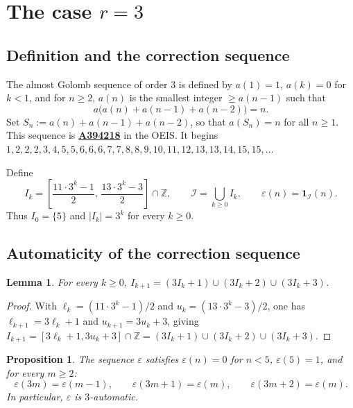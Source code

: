 \documentclass[12pt]{article}
\newtheorem{lemma}[theorem]{Lemma}
\newtheorem{proposition}[theorem]{Proposition}
\theoremstyle{definition}
\theoremstyle{remark}
\newcommand{\oeis}[1]{\href{https://oeis.org/#1}{\textbf{#1}}}
\begin{document}
\section{The case $r=3$}\label{sec:r3}

\subsection{Definition and the correction sequence}

The almost Golomb sequence of order $3$ is defined by $a(1)=1$, $a(k)=0$ for $k<1$,
and for $n\ge 2$, $a(n)$ is the smallest integer $\ge a(n-1)$ such that
\begin{equation}\label{eq:r3def}
  a\bigl(a(n)+a(n-1)+a(n-2)\bigr)=n.
\end{equation}
Set $S_n:=a(n)+a(n-1)+a(n-2)$, so that $a(S_n)=n$ for all $n\ge 1$.
This sequence is \oeis{A394218} in the OEIS. It begins
$1,2,2,2,3,4,5,5,6,6,6,7,7,8,8,9,10,11,12,13,13,14,15,15,\ldots$

Define
\begin{equation}\label{eq:Ik}
  I_k=\left[\frac{11\cdot 3^k-1}{2},\,\frac{13\cdot 3^k-3}{2}\right]\cap\mathbb{Z},
  \qquad
  \mathcal{I}=\bigcup_{k\ge 0} I_k,
  \qquad
  \varepsilon(n)=\mathbf{1}_{\mathcal{I}}(n).
\end{equation}
Thus $I_0=\{5\}$ and $|I_k|=3^k$ for every $k\ge 0$.

\subsection{Automaticity of the correction sequence}

\begin{lemma}\label{lem:selfsim}
For every $k\ge 0$, $I_{k+1}=(3I_k+1)\cup(3I_k+2)\cup(3I_k+3)$.
\end{lemma}

\begin{proof}
With $\ell_k=(11\cdot 3^k-1)/2$ and $u_k=(13\cdot 3^k-3)/2$,
one has $\ell_{k+1}=3\ell_k+1$ and $u_{k+1}=3u_k+3$, giving
$I_{k+1}=[3\ell_k+1,3u_k+3]\cap\mathbb{Z}=(3I_k+1)\cup(3I_k+2)\cup(3I_k+3)$.
\end{proof}

\begin{proposition}\label{prop:eps-auto}
The sequence $\varepsilon$ satisfies $\varepsilon(n)=0$ for $n<5$, $\varepsilon(5)=1$,
and for every $m\ge 2$:
\begin{equation}\label{eq:eps-rec}
  \varepsilon(3m)=\varepsilon(m-1),\qquad
  \varepsilon(3m+1)=\varepsilon(m),\qquad
  \varepsilon(3m+2)=\varepsilon(m).
\end{equation}
In particular, $\varepsilon$ is $3$-automatic.
\end{proposition}
\end{document}
